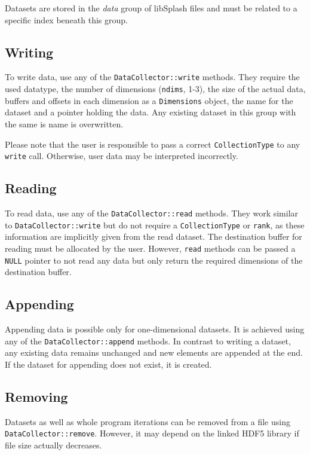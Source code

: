 \documentclass[a4paper,10pt,BCOR12mm]{report}
\newcommand{\code}[1]{\small \texttt{#1}}
\begin{document}
Datasets are stored in the \emph{data} group of libSplash files and must be
related to a specific index beneath this group.

\subsection{Writing}
\label{lab:sdc:write}

To write data, use any of the \code{DataCollector::write} methods.
They require the used datatype, the number
of dimensions (\code{ndims}, 1-3), the size of the actual data, buffers and offsets in
each dimension as a \code{Dimensions} object, the name for the dataset and a pointer
holding the data.
Any existing dataset in this group with the same is name is overwritten.

Please note that the user is responsible to pass a correct \code{CollectionType} to
any \code{write} call. Otherwise, user data may be interpreted incorrectly.

\subsection{Reading}

To read data, use any of the \code{DataCollector::read} methods.
They work similar to \code{DataCollector::write} but do not require
a \code{CollectionType} or \code{rank}, as these information are implicitly given from
the read dataset.
The destination buffer for reading must be allocated by the user. However, \code{read} methods
can be passed a \code{NULL} pointer to not read any data but only return the required dimensions of the
destination buffer.

\subsection{Appending}

Appending data is possible only for one-dimensional datasets.
It is achieved using any of the \code{DataCollector::append} methods.
In contrast to writing a dataset, any existing data remains unchanged and
new elements are appended at the end.
If the dataset for appending does not exist, it is created.

\subsection{Removing}

Datasets as well as whole program iterations can be removed from a file using\\ \code{DataCollector::remove}.
However, it may depend on the linked HDF5 library if file size actually decreases.
\end{document}

